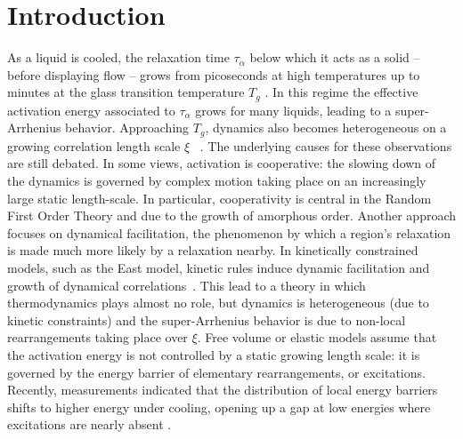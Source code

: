 \documentclass[pre,twocolumn,superscriptaddress,tightenlines,showpacs,longbibliography,floatfix,footinbib]{revtex4-1}
\begin{document}
\section{Introduction}



As a liquid is cooled,  the relaxation time $\tau_\alpha$ below which it acts as a solid -- before displaying flow --  grows from picoseconds at high temperatures up to minutes at the glass transition temperature $T_g$ \cite{Anderson95,ediger1996supercooled,Debenedetti01,berthier2011theoretical}. In this regime the effective activation energy associated to $\tau_\alpha$ grows for many liquids, leading to a super-Arrhenius behavior. 
Approaching $T_g$, dynamics also becomes heterogeneous on a growing correlation length scale $\xi$ ~\cite{kob1997dynamical,yamamoto1998dynamics,dalle2007spatial,karmakar2014growing}. The underlying causes for these observations are still debated. In some views, activation is cooperative: the slowing down of the dynamics is governed by complex motion taking place on an increasingly large static length-scale. 
In particular, cooperativity is central in the Random First Order Theory  \cite{kirkpatrick1989scaling,lubchenko2007theory,Biroli12} and due to the growth of amorphous order. Another approach focuses on dynamical facilitation, the phenomenon by which a region's relaxation is made much more likely by a relaxation nearby. In  kinetically constrained models, such as the East model, kinetic rules induce dynamic facilitation and growth of dynamical correlations~\cite{ritort2003glassy,berthier2011dynamical}. This lead to a theory \cite{garrahan2002geometrical,garrahan2007dynamical,hedges2009dynamic} in which thermodynamics plays almost no role, but dynamics is heterogeneous (due to kinetic constraints) and the super-Arrhenius behavior is due to non-local rearrangements taking place over $\xi$. 
Free volume \cite{turnbull1961free} or elastic \cite{dyre2006colloquium,rainone2020pinching,JeppeEdan} models assume that the activation energy is not controlled by a static growing length scale: it is governed by the energy barrier of elementary rearrangements, or excitations. Recently,  measurements indicated that the distribution of local energy barriers shifts to higher energy under cooling, opening up a gap at low energies where excitations are nearly absent \cite{massimo}. 
\end{document}
